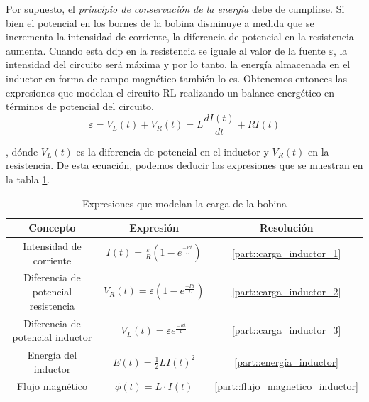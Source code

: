 \documentclass[../main.tex]{subfiles}
\begin{document}
Por supuesto, el \textit{principio de conservación de la energía} debe de cumplirse. Si bien el potencial en los bornes de la bobina disminuye a medida que se incrementa la intensidad de corriente, la diferencia de potencial en la resistencia aumenta. Cuando esta ddp en la resistencia se iguale al valor de la fuente $\varepsilon$, la intensidad del circuito será máxima y por lo tanto, la energía almacenada en el inductor en forma de campo magnético también lo es. Obtenemos entonces las expresiones que modelan el circuito RL realizando un balance energético en términos de potencial del circuito.
\begin{equation}
    \label{eqq::carga_bobina}
    \varepsilon = V_L(t) + V_R(t) = L \frac{d I(t)}{d t} + R I(t)
\end{equation}

, dónde $V_L(t)$ es la diferencia de potencial en el inductor y $V_R(t)$ en la resistencia. De esta ecuación, podemos deducir las expresiones que se muestran en la tabla \ref{tab::ecuaciones_carga_rl}.

\begin{table}[!ht]
        \begin{center}
            \begin{tabular}{|| c | c | c ||}
                \hline
                \textbf{Concepto} & \textbf{Expresión} &  \textbf{Resolución}\\ \hline
                Intensidad de corriente & $I(t) = \frac{\varepsilon}{R} \left( 1 - e^{\frac{-Rt}{L}}\right)$ & \ref{part::carga_inductor_1}\\
                Diferencia de potencial resistencia & $V_R(t) = \varepsilon \left( 1 - e^{\frac{-Rt}{L}}\right)$ & \ref{part::carga_inductor_2} \\ 
                Diferencia de potencial inductor & $V_L(t) = \varepsilon   e^{\frac{-Rt}{L}}$ & \ref{part::carga_inductor_3} \\ 
                Energía del inductor & $E(t) = \frac{1}{2}LI(t)^2 $ & \ref{part::energía_inductor} \\
                Flujo magnético & $\phi (t) = L \cdot I(t)$ & \ref{part::flujo_magnetico_inductor} \\
                \hline
                \end{tabular}
                \caption{Expresiones que modelan la carga de la bobina}
                \label{tab::ecuaciones_carga_rl}
        \end{center}
    \end{table}
\end{document}
